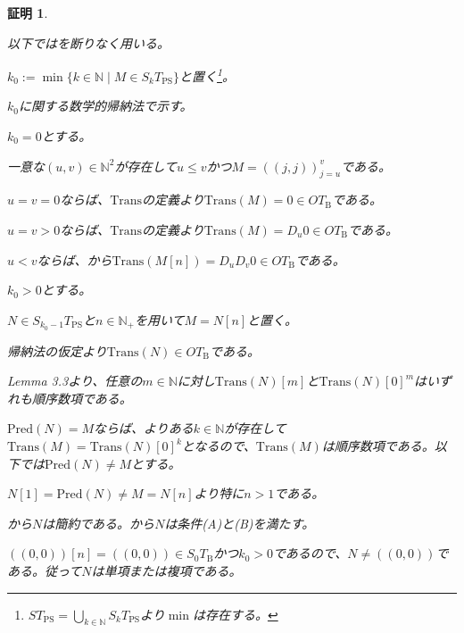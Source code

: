 \documentclass[dvipdfmx,uplatex]{jsarticle}
\theoremstyle{customnonumberbreakfortheorem}
\theoremstyle{customnonumberbreakforproof}
\newtheorem{hideableproof}{証明}
\begin{document}
\begin{hideableproof}
	\begin{indented}
		\item 以下ではを断りなく用いる。
		\item
		\item \(k_0 := \min \{k \in \mathbb{N} \mid M \in S_kT_{\textrm{PS}}\}\)と置く\footnote{\(ST_{\textrm{PS}} = \bigcup_{k \in \mathbb{N}} S_kT_{\textrm{PS}}\)より\(\min\)は存在する。}。
		\item \(k_0\)に関する数学的帰納法で示す。
		\item \(k_0 = 0\)とする。
		\begin{indented}
			\item 一意な\((u,v) \in \mathbb{N}^2\)が存在して\(u \leq v\)かつ\(M = ((j,j))_{j=u}^{v}\)である。
			\item \(u = v = 0\)ならば、\(\textrm{Trans}\)の定義より\(\textrm{Trans}(M) = 0 \in OT_{\textrm{B}}\)である。
			\item \(u = v > 0\)ならば、\(\textrm{Trans}\)の定義より\(\textrm{Trans}(M) = D_u 0 \in OT_{\textrm{B}}\)である。
			\item \(u < v\)ならば、から\(\textrm{Trans}(M[n]) = D_u D_v 0 \in OT_{\textrm{B}}\)である。
		\end{indented}
		\item \(k_0 > 0\)とする。
		\begin{indented}
			\item \(N \in S_{k_0-1}T_{\textrm{PS}}\)と\(n \in \mathbb{N}_{+}\)を用いて\(M = N[n]\)と置く。
			\item 帰納法の仮定より\(\textrm{Trans}(N) \in OT_{\textrm{B}}\)である。
			\item \cite{buc1} Lemma 3.3より、任意の\(m \in \mathbb{N}\)に対し\(\textrm{Trans}(N)[m]\)と\(\textrm{Trans}(N)[0]^m\)はいずれも順序数項である。
			\item \(\textrm{Pred}(N) = M\)ならば、よりある\(k \in \mathbb{N}\)が存在して\(\textrm{Trans}(M) = \textrm{Trans}(N)[0]^k\)となるので、\(\textrm{Trans}(M)\)は順序数項である。以下では\(\textrm{Pred}(N) \neq M\)とする。
			\item \(N[1] = \textrm{Pred}(N) \neq M = N[n]\)より特に\(n > 1\)である。
			\item {}から\(N\)は簡約である。から\(N\)は条件(A)と(B)を満たす。
			\item \(((0,0))[n] = ((0,0)) \in S_0T_{\textrm{B}}\)かつ\(k_0 > 0\)であるので、\(N \neq ((0,0))\)である。従って\(N\)は単項または複項である。

\end{indented}
\end{indented}
\end{hideableproof}
\end{document}
